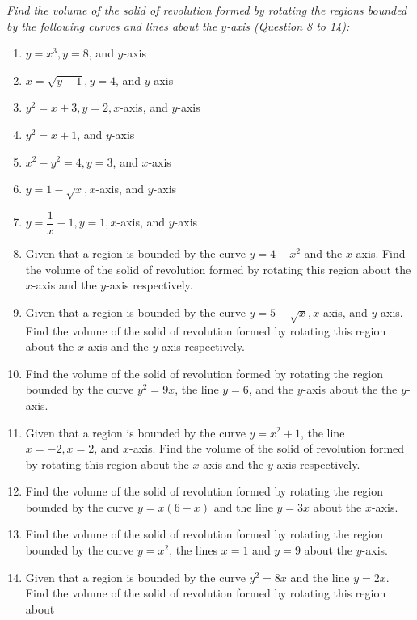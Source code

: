 \documentclass{report}
\begin{document}
\noindent \hspace{1.2em}\textit{Find the volume of the solid of revolution formed by rotating the regions bounded by the following curves and lines about the $y$-axis (Question 8 to 14):}

\begin{enumerate}[resume]
    \item $y=x^3, y=8$, and $y$-axis
    \item $x=\sqrt{y-1}, y=4$, and $y$-axis
    \item $y^2=x+3, y=2, x$-axis, and $y$-axis
    \item $y^2=x+1$, and $y$-axis
    \item $x^2-y^2=4, y=3$, and $x$-axis
    \item $y=1-\sqrt{x}, x$-axis, and $y$-axis
    \item $y=\dfrac{1}{x}-1, y=1, x$-axis, and $y$-axis
    \item Given that a region is bounded by the curve $y=4-x^2$ and the $x$-axis. Find
          the volume of the solid of revolution formed by rotating this region about the
          $x$-axis and the $y$-axis respectively.
    \item Given that a region is bounded by the curve $y=5-\sqrt{x}, x$-axis, and
          $y$-axis. Find the volume of the solid of revolution formed by rotating this
          region about the $x$-axis and the $y$-axis respectively.
    \item Find the volume of the solid of revolution formed by rotating the region
          bounded by the curve $y^2=9 x$, the line $y=6$, and the $y$-axis about the the
          $y$-axis.
    \item Given that a region is bounded by the curve $y=x^2+1$, the line $x=-2, x=2$,
          and $x$-axis. Find the volume of the solid of revolution formed by rotating
          this region about the $x$-axis and the $y$-axis respectively.
    \item Find the volume of the solid of revolution formed by rotating the region
          bounded by the curve $y=x(6-x)$ and the line $y=3 x$ about the $x$-axis.
    \item Find the volume of the solid of revolution formed by rotating the region
          bounded by the curve $y=x^2$, the lines $x=1$ and $y=9$ about the $y$-axis.
    \item Given that a region is bounded by the curve $y^2=8 x$ and the line $y=2 x$.
          Find the volume of the solid of revolution formed by rotating this region about

\end{enumerate}
\end{document}
